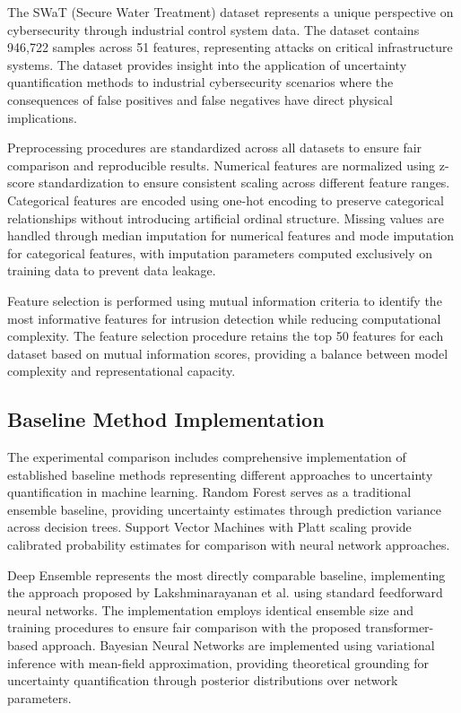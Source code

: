 \documentclass[journal]{IEEEtran}
\begin{document}
The SWaT (Secure Water Treatment) dataset represents a unique perspective on cybersecurity through industrial control system data. The dataset contains 946,722 samples across 51 features, representing attacks on critical infrastructure systems. The dataset provides insight into the application of uncertainty quantification methods to industrial cybersecurity scenarios where the consequences of false positives and false negatives have direct physical implications.

Preprocessing procedures are standardized across all datasets to ensure fair comparison and reproducible results. Numerical features are normalized using z-score standardization to ensure consistent scaling across different feature ranges. Categorical features are encoded using one-hot encoding to preserve categorical relationships without introducing artificial ordinal structure. Missing values are handled through median imputation for numerical features and mode imputation for categorical features, with imputation parameters computed exclusively on training data to prevent data leakage.

Feature selection is performed using mutual information criteria to identify the most informative features for intrusion detection while reducing computational complexity. The feature selection procedure retains the top 50 features for each dataset based on mutual information scores, providing a balance between model complexity and representational capacity.

\subsection{Baseline Method Implementation}

The experimental comparison includes comprehensive implementation of established baseline methods representing different approaches to uncertainty quantification in machine learning. Random Forest serves as a traditional ensemble baseline, providing uncertainty estimates through prediction variance across decision trees. Support Vector Machines with Platt scaling provide calibrated probability estimates for comparison with neural network approaches.

Deep Ensemble represents the most directly comparable baseline, implementing the approach proposed by Lakshminarayanan et al. using standard feedforward neural networks. The implementation employs identical ensemble size and training procedures to ensure fair comparison with the proposed transformer-based approach. Bayesian Neural Networks are implemented using variational inference with mean-field approximation, providing theoretical grounding for uncertainty quantification through posterior distributions over network parameters.
\end{document}
